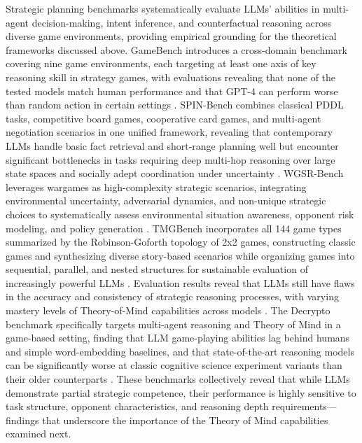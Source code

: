 \documentclass[11pt]{article}
\begin{document}
Strategic planning benchmarks systematically evaluate LLMs' abilities in multi-agent decision-making, intent inference, and counterfactual reasoning across diverse game environments, providing empirical grounding for the theoretical frameworks discussed above. GameBench introduces a cross-domain benchmark covering nine game environments, each targeting at least one axis of key reasoning skill in strategy games, with evaluations revealing that none of the tested models match human performance and that GPT-4 can perform worse than random action in certain settings \cite{ref223}. SPIN-Bench combines classical PDDL tasks, competitive board games, cooperative card games, and multi-agent negotiation scenarios in one unified framework, revealing that contemporary LLMs handle basic fact retrieval and short-range planning well but encounter significant bottlenecks in tasks requiring deep multi-hop reasoning over large state spaces and socially adept coordination under uncertainty \cite{ref224}. WGSR-Bench leverages wargames as high-complexity strategic scenarios, integrating environmental uncertainty, adversarial dynamics, and non-unique strategic choices to systematically assess environmental situation awareness, opponent risk modeling, and policy generation \cite{ref225}. TMGBench incorporates all 144 game types summarized by the Robinson-Goforth topology of 2x2 games, constructing classic games and synthesizing diverse story-based scenarios while organizing games into sequential, parallel, and nested structures for sustainable evaluation of increasingly powerful LLMs \cite{ref226}. Evaluation results reveal that LLMs still have flaws in the accuracy and consistency of strategic reasoning processes, with varying mastery levels of Theory-of-Mind capabilities across models \cite{ref226}. The Decrypto benchmark specifically targets multi-agent reasoning and Theory of Mind in a game-based setting, finding that LLM game-playing abilities lag behind humans and simple word-embedding baselines, and that state-of-the-art reasoning models can be significantly worse at classic cognitive science experiment variants than their older counterparts \cite{ref227}. These benchmarks collectively reveal that while LLMs demonstrate partial strategic competence, their performance is highly sensitive to task structure, opponent characteristics, and reasoning depth requirements---findings that underscore the importance of the Theory of Mind capabilities examined next.
\end{document}
